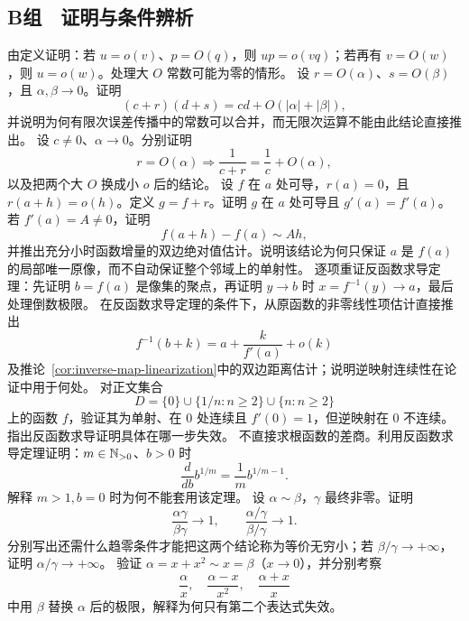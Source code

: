 \subsection*{B组　证明与条件辨析}
\begin{enumerate}[label=\textbf{\thechapter.\arabic*.},resume]
  由定义证明：若 \(u=o(v)\)、\(p=O(q)\)，则 \(up=o(vq)\)；若再有 \(v=O(w)\)，则 \(u=o(w)\)。处理大 \(O\) 常数可能为零的情形。
  设 \(r=O(\alpha)\)、\(s=O(\beta)\)，且 \(\alpha,\beta\to0\)。证明
 \[
  (c+r)(d+s)=cd+O(|\alpha|+|\beta|),
 \]
并说明为何有限次误差传播中的常数可以合并，而无限次运算不能由此结论直接推出。
  设 \(c\ne0\)、\(\alpha\to0\)。分别证明
 \[
  r=O(\alpha)\Longrightarrow
  \frac1{c+r}=\frac1c+O(\alpha),
 \]
以及把两个大 \(O\) 换成小 \(o\) 后的结论。
  设 \(f\) 在 \(a\) 处可导，\(r(a)=0\)，且 \(r(a+h)=o(h)\)。定义 \(g=f+r\)。证明 \(g\) 在 \(a\) 处可导且 \(g'(a)=f'(a)\)。
  若 \(f'(a)=A\ne0\)，证明
 \[
  f(a+h)-f(a)\sim Ah,
 \]
并推出充分小时函数增量的双边绝对值估计。说明该结论为何只保证 \(a\) 是 \(f(a)\) 的局部唯一原像，而不自动保证整个邻域上的单射性。
  逐项重证反函数求导定理：先证明 \(b=f(a)\) 是像集的聚点，再证明 \(y\to b\) 时 \(x=f^{-1}(y)\to a\)，最后处理倒数极限。
  在反函数求导定理的条件下，从原函数的非零线性项估计直接推出
 \[
  f^{-1}(b+k)=a+\frac{k}{f'(a)}+o(k)
 \]
 及推论~\ref{cor:inverse-map-linearization}中的双边距离估计；说明逆映射连续性在论证中用于何处。
  对正文集合
 \[
  D=\{0\}\cup\{1/n:n\ge2\}\cup\{n:n\ge2\}
 \]
上的函数 \(f\)，验证其为单射、在 \(0\) 处连续且 \(f'(0)=1\)，但逆映射在 \(0\) 不连续。指出反函数求导证明具体在哪一步失效。
  不直接求根函数的差商。利用反函数求导定理证明：\(m\in\mathbb{N}_{>0}\)、\(b>0\) 时
 \[
  \frac{d}{db}b^{1/m}=\frac1m b^{1/m-1}.
 \]
解释 \(m>1,b=0\) 时为何不能套用该定理。
  设 \(\alpha\sim\beta\)，\(\gamma\) 最终非零。证明
 \[
  \frac{\alpha\gamma}{\beta\gamma}\to1,\qquad
  \frac{\alpha/\gamma}{\beta/\gamma}\to1.
 \]
 分别写出还需什么趋零条件才能把这两个结论称为等价无穷小；若 \(\beta/\gamma\to+\infty\)，证明 \(\alpha/\gamma\to+\infty\)。
  验证 \(\alpha=x+x^2\sim x=\beta\)（\(x\to0\)），并分别考察
 \[
  \frac{\alpha}{x},\quad
  \frac{\alpha-x}{x^2},\quad
  \frac{\alpha+x}{x}
 \]
中用 \(\beta\) 替换 \(\alpha\) 后的极限，解释为何只有第二个表达式失效。
\end{enumerate}

